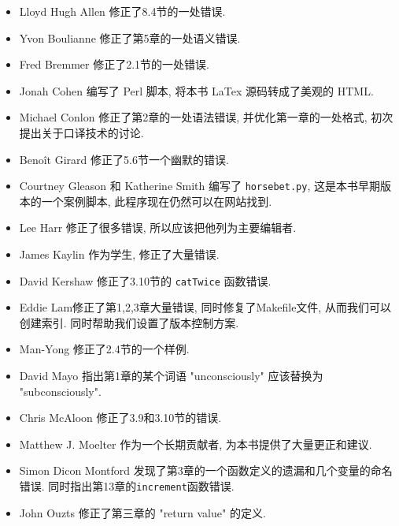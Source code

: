 \documentclass[10pt]{book}
\begin{document}
\begin{itemize}

\small
\item Lloyd Hugh Allen 修正了8.4节的一处错误. 

\item Yvon Boulianne 修正了第5章的一处语义错误. 

\item Fred Bremmer 修正了2.1节的一处错误. 

\item Jonah Cohen 编写了 Perl 脚本, 将本书 LaTex 源码转成了美观的 HTML. 

\item Michael Conlon 修正了第2章的一处语法错误, 并优化第一章的一处格式, 
初次提出关于口译技术的讨论. 

\item Beno\^{i}t Girard 修正了5.6节一个幽默的错误. 

\item Courtney Gleason 和 Katherine Smith 编写了 {\tt horsebet.py}, 
这是本书早期版本的一个案例脚本, 此程序现在仍然可以在网站找到. 

\item Lee Harr 修正了很多错误, 所以应该把他列为主要编辑者. 

\item James Kaylin 作为学生, 修正了大量错误. 

\item David Kershaw 修正了3.10节的 {\tt catTwice} 函数错误. 

\item Eddie Lam修正了第1,2,3章大量错误, 同时修复了Makefile文件, 
从而我们可以创建索引. 同时帮助我们设置了版本控制方案. 

\item Man-Yong 修正了2.4节的一个样例. 

\item David Mayo 指出第1章的某个词语 "unconsciously"
应该替换为 "subconsciously".

\item Chris McAloon 修正了3.9和3.10节的错误. 

\item Matthew J. Moelter 作为一个长期贡献者, 为本书提供了大量更正和建议. 

\item Simon Dicon Montford 发现了第3章的一个函数定义的遗漏和几个变量的命名错误. 
同时指出第13章的{\tt increment}函数错误. 

\item John Ouzts 修正了第三章的 "return value" 的定义. 


\end{itemize}
\end{document}
